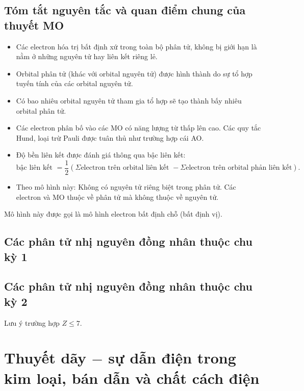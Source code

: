 \subsection{Tóm tắt nguyên tắc và quan điểm chung của thuyết MO}
\begin{itemize}
\item Các electron hóa trị bất định xứ trong toàn bộ phân tử, không bị giới hạn là nằm ở những nguyên tử hay liên kết riêng lẻ.
\item Orbital phân tử (khác với orbital nguyên tử) được hình thành do sự tổ hợp tuyến tính của các orbital nguyên tử.
\item Có bao nhiêu orbital nguyên tử tham gia tổ hợp sẽ tạo thành bấy nhiêu orbital phân tử.
\item Các electron phân bố vào các MO có năng lượng từ thấp lên cao. Các quy tắc Hund, loại trừ Pauli được tuân thủ như trường hợp cái AO.
\item Độ bền liên kết được đánh giá thông qua bậc liên kết:
$$\text{bậc liên kết } = \frac{1}{2} \left( {\Sigma \text{electron trên orbital liên kết } - \Sigma \text{electron trên orbital phản liên kết} } \right).$$
\item Theo mô hình này:
\subitem Không có nguyên tử riêng biệt trong phân tử.
\subitem Các electron và MO thuộc về phân tử mà không thuộc về nguyên tử.
\end{itemize}
Mô hình này được gọi là mô hình electron bất định chỗ (bất định vị).
\subsection{Các phân tử nhị nguyên đồng nhân thuộc chu kỳ 1}
\subsection{Các phân tử nhị nguyên đồng nhân thuộc chu kỳ 2}
Lưu ý trường hợp $Z \leqslant 7.$
\section{Thuyết dãy $-$ sự dẫn điện trong kim loại, bán dẫn và chất cách điện}